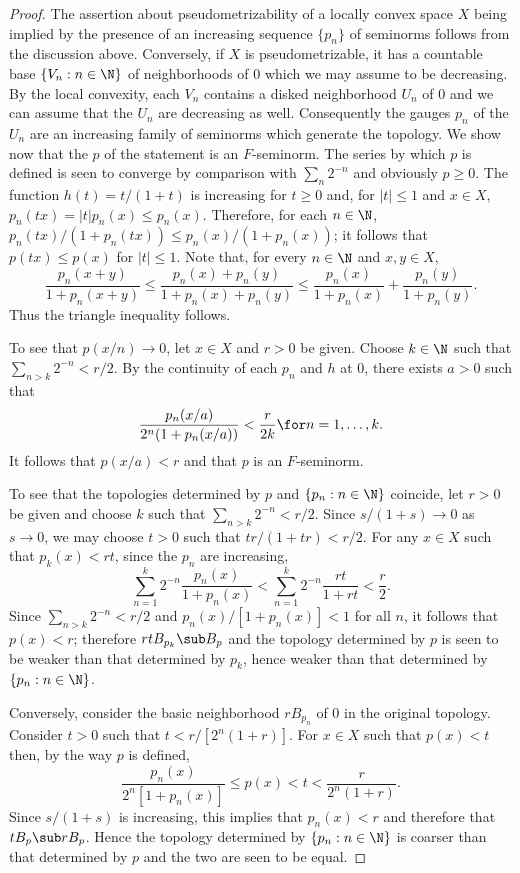 \begin{proof}
The assertion about pseudometrizability of a locally convex space $X$ being implied by the presence of an increasing sequence $\{p_n\}$ of seminorms follows from the discussion above. Conversely, if $X$ is pseudometrizable, it has a countable base $\{V_n:n\in\N\}$ of neighborhoods of $0$ which we may assume to be decreasing. By the local convexity, each $V_n$ contains a disked neighborhood $U_n$ of $0$ and we can assume that the $U_n$ are decreasing as well. Consequently the gauges $p_n$ of the $U_n$ are an increasing family of seminorms which generate the topology. We show now that the $p$ of the statement is an $F$-seminorm. The series by which $p$ is defined is seen to converge by comparison with $\sum_n2^{-n}$ and obviously $p\geq 0$. The function $h(t)=t/(1+t)$ is increasing for $t\geq 0$ and, for $|t|\leq 1$ and $x\in X$, $p_n(tx)=|t|p_n(x)\leq p_n(x)$. Therefore, for each $n\in\N$, $p_n(tx)/(1+p_n(tx))\leq p_n(x)/(1+p_n(x))$; it follows that $p(tx)\leq p(x)$ for $|t|\leq 1$. Note that, for every $n\in\N$ and $x,y\in X$,
\[\frac{p_n(x+y)}{1+p_n(x+y)}\leq\frac{p_n(x)+p_n(y)}{1+p_n(x)+p_n(y)}\leq\frac{p_n(x)}{1+p_n(x)}+\frac{p_n(y)}{1+p_n(y)}.\]
Thus the triangle inequality follows.\par
To see that $p(x/n)\to 0$, let $x\in X$ and $r>0$ be given. Choose $k\in\N$ such that $\sum_{n>k}2^{-n}<r/2$. By the continuity of each $p_n$ and $h$ at $0$, there exists $a>0$ such that
\[\frac{p_n(x/a)}{2^n(1+p_n(x/a))}<\frac{r}{2k}\for n=1,\dots,k.\]
It follows that $p(x/a)<r$ and that $p$ is an $F$-seminorm.\par
To see that the topologies determined by $p$ and $\{p_n:n\in\N\}$ coincide, let $r>0$ be given and choose $k$ such that $\sum_{n>k}2^{-n}<r/2$. Since $s/(1+s)\to 0$ as $s\to 0$, we may choose $t>0$ such that $tr/(1+tr)<r/2$. For any $x\in X$ such that $p_k(x)<rt$, since the $p_n$ are increasing,
\[\sum_{n=1}^{k}2^{-n}\frac{p_n(x)}{1+p_n(x)}<\sum_{n=1}^{k}2^{-n}\frac{rt}{1+rt}<\frac{r}{2}.\]
Since $\sum_{n>k}2^{-n}<r/2$ and $p_n(x)/[1+p_n(x)]<1$ for all $n$, it follows that $p(x)<r$; therefore $rtB_{p_k}\sub B_p$ and the topology determined by $p$ is seen to be weaker than that determined by $p_k$, hence weaker than that determined by $\{p_n:n\in\N\}$.\par
Conversely, consider the basic neighborhood $rB_{p_n}$ of $0$ in the original topology. Consider $t>0$ such that $t<r/[2^n(1+r)]$. For $x\in X$ such that $p(x)<t$ then, by the way $p$ is defined,
\[\frac{p_n(x)}{2^n[1+p_n(x)]}\leq p(x)<t<\frac{r}{2^n(1+r)}.\]
Since $s/(1+s)$ is increasing, this implies that $p_n(x)<r$ and therefore that $tB_{p}\sub rB_{p}$. Hence the topology determined by $\{p_n:n\in\N\}$ is coarser than that determined by $p$ and the two are seen to be equal.
\end{proof}
